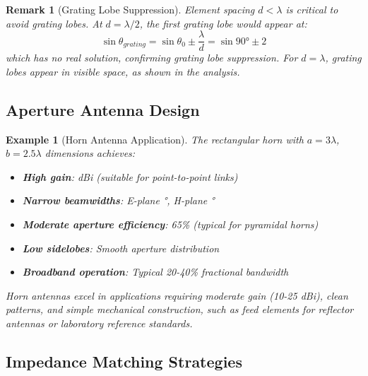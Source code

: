 \documentclass[a4paper, 11pt]{article}
\newtheorem{example}{Example}[section]
\newtheorem{remark}{Remark}[section]
\begin{document}
\begin{remark}[Grating Lobe Suppression]
Element spacing $d < \lambda$ is critical to avoid grating lobes. At $d = \lambda/2$, the first grating lobe would appear at:
\begin{equation}
\sin\theta_{grating} = \sin\theta_0 \pm \frac{\lambda}{d} = \sin 90° \pm 2
\end{equation}
which has no real solution, confirming grating lobe suppression. For $d = \lambda$, grating lobes appear in visible space, as shown in the analysis.
\end{remark}

\subsection{Aperture Antenna Design}

\begin{example}[Horn Antenna Application]
The rectangular horn with $a = 3\lambda$, $b = 2.5\lambda$ dimensions achieves:
\begin{itemize}
\item \textbf{High gain}:  dBi (suitable for point-to-point links)
\item \textbf{Narrow beamwidths}: E-plane \si{\degree}, H-plane \si{\degree}
\item \textbf{Moderate aperture efficiency}: 65\% (typical for pyramidal horns)
\item \textbf{Low sidelobes}: Smooth aperture distribution
\item \textbf{Broadband operation}: Typical 20-40\% fractional bandwidth
\end{itemize}
Horn antennas excel in applications requiring moderate gain (10-25 dBi), clean patterns, and simple mechanical construction, such as feed elements for reflector antennas or laboratory reference standards.
\end{example}

\subsection{Impedance Matching Strategies}
\end{document}
